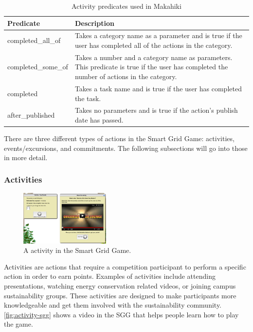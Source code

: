 \begin{table}[t!]
	\begin{tabular}{| l || p{11cm} |}
		\hline
		Predicate & Description \\
		\hline
		completed\_all\_of & Takes a category name as a parameter and is true if the user has completed all of the actions in the category.\\
		completed\_some\_of & Takes a number and a category name as parameters. This predicate is true if the user has completed the number of actions in the category.\\
		completed & Takes a task name and is true if the user has completed the task.\\
		after\_published & Takes no parameters and is true if the action's publish date has passed.\\
		\hline
	\end{tabular}
	\caption{Activity predicates used in Makahiki}
	\label{table:activity-predicates}
\end{table}

There are three different types of actions in the Smart Grid Game: activities, events/excursions, and commitments. The following subsections will go into those in more detail.

\subsubsection{Activities}
\label{pages-getnutz:activities}

\begin{figure}[h]
  \center
  \includegraphics[width=0.4\textwidth]{images/activity.eps}
  \caption{A activity in the Smart Grid Game.}
  \label{fig:activity-sgg}
\end{figure}

Activities are actions that require a competition participant to perform a specific action in order to earn points.  Examples of activities include attending presentations, watching energy conservation related videos, or joining campus sustainability groups.  These activities are designed to make participants more knowledgeable and get them involved with the sustainability community. \autoref{fig:activity-sgg} shows a video in the SGG that helps people learn how to play the game.

